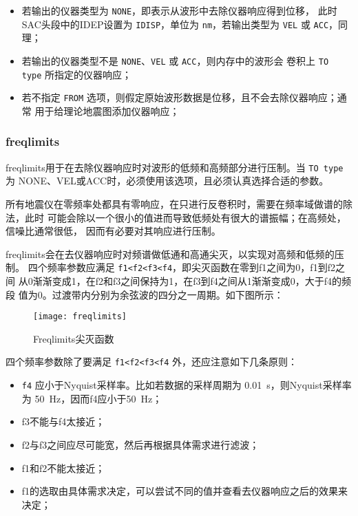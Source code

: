 \begin{itemize}
\item 若输出的仪器类型为 \texttt{NONE}，即表示从波形中去除仪器响应得到位移，
    此时SAC头段中的IDEP设置为 \texttt{IDISP}，单位为 \texttt{nm}，若输出类型为
    \texttt{VEL} 或 \texttt{ACC}，同理；
\item 若输出的仪器类型不是 \texttt{NONE}、\texttt{VEL} 或 \texttt{ACC}，则内存中的波形会
    卷积上 \texttt{TO type} 所指定的仪器响应；
\item 若不指定 \texttt{FROM} 选项，则假定原始波形数据是位移，且不会去除仪器响应；通常
    用于给理论地震图添加仪器响应；
\end{itemize}

\subsubsection{freqlimits}
freqlimits用于在去除仪器响应时对波形的低频和高频部分进行压制。当 \texttt{TO type} 为
NONE、VEL或ACC时，必须使用该选项，且必须认真选择合适的参数。

所有地震仪在零频率处都具有零响应，在只进行反卷积时，需要在频率域做谱的除法，此时
可能会除以一个很小的值进而导致低频处有很大的谱振幅；在高频处，信噪比通常很低，
因而有必要对其响应进行压制。

freqlimits会在去仪器响应时对频谱做低通和高通尖灭，以实现对高频和低频的压制。
四个频率参数应满足 \texttt{f1<f2<f3<f4}，即尖灭函数在零到f1之间为0，f1到f2之间
从0渐渐变成1，在f2和f3之间保持为1，在f3到f4之间从1渐渐变成0，大于f4的频段
值为0。过渡带内分别为余弦波的四分之一周期。如下图所示：

\begin{figure}[H]
\centering
\texttt{[image: freqlimits]}
\caption{Freqlimits尖灭函数}
\label{fig:freqlimits}
\end{figure}

四个频率参数除了要满足 \texttt{f1<f2<f3<f4} 外，还应注意如下几条原则：
\begin{itemize}
\item \texttt{f4} 应小于Nyquist采样率。比如若数据的采样周期为 \SI{0.01}{\s}，则Nyquist采样率
    为 \SI{50}{\Hz}，因而f4应小于\SI{50}{\Hz}；
\item f3不能与f4太接近；
\item f2与f3之间应尽可能宽，然后再根据具体需求进行滤波；
\item f1和f2不能太接近；
\item f1的选取由具体需求决定，可以尝试不同的值并查看去仪器响应之后的效果来决定；
\end{itemize}

